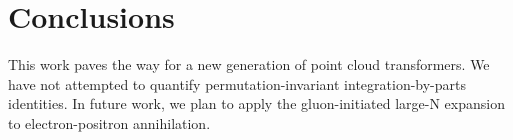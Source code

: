 \section{Conclusions}\label{sec:conclusions}

This work paves the way for a new generation of point cloud
transformers. We have not attempted to quantify permutation-invariant
integration-by-parts identities. In future work, we plan to apply the
gluon-initiated large-N expansion to electron-positron annihilation.

